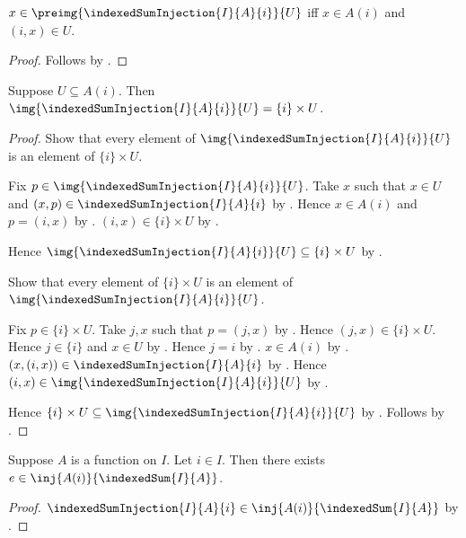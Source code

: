 \begin{proposition}\label{indexed_sum_injection_preimage_iff}
    $x\in\preimg{\indexedSumInjection{I}{A}{i}}{U}$ iff
        $x\in A(i)$ and $(i,x)\in U$.
\end{proposition}
\begin{proof}
    Follows by
        .
\end{proof}

\begin{proposition}\label{indexed_sum_injection_image}
    Suppose $U\subseteq A(i)$.
    Then $\img{\indexedSumInjection{I}{A}{i}}{U}=\{i\}\times U$.
\end{proposition}
\begin{proof}
    Show that every element of
        $\img{\indexedSumInjection{I}{A}{i}}{U}$ is an element of
        $\{i\}\times U$.
    \begin{subproof}
        Fix $p\in\img{\indexedSumInjection{I}{A}{i}}{U}$.
        Take $x$ such that $x\in U$ and
            $(x,p)\in\indexedSumInjection{I}{A}{i}$ by .
        Hence $x\in A(i)$ and $p=(i,x)$ by
            .
        $(i,x)\in\{i\}\times U$ by
            .
    \end{subproof}
    Hence $\img{\indexedSumInjection{I}{A}{i}}{U}
        \subseteq\{i\}\times U$ by .

    Show that every element of $\{i\}\times U$ is an element of
        $\img{\indexedSumInjection{I}{A}{i}}{U}$.
    \begin{subproof}
        Fix $p\in\{i\}\times U$.
        Take $j,x$ such that $p=(j,x)$ by
            .
        Hence $(j,x)\in\{i\}\times U$.
        Hence $j\in\{i\}$ and $x\in U$ by .
        Hence $j=i$ by .
        $x\in A(i)$ by .
        $(x,(i,x))\in\indexedSumInjection{I}{A}{i}$ by
            .
        Hence $(i,x)\in\img{\indexedSumInjection{I}{A}{i}}{U}$ by
            .
    \end{subproof}
    Hence $\{i\}\times U
        \subseteq\img{\indexedSumInjection{I}{A}{i}}{U}$ by
        .
    Follows by .
\end{proof}

\begin{theorem}\label{indexed_sum_fibre_injection}
    Suppose $A$ is a function on $I$.
    Let $i\in I$.
    Then there exists $e\in\inj{A(i)}{\indexedSum{I}{A}}$.
\end{theorem}
\begin{proof}
    $\indexedSumInjection{I}{A}{i}
        \in\inj{A(i)}{\indexedSum{I}{A}}$ by
        .
\end{proof}

